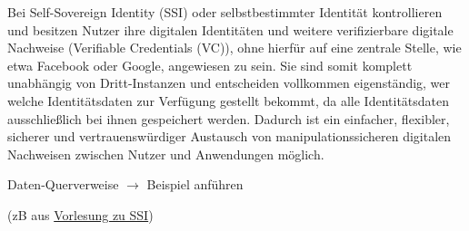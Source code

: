 \begin{Solution}

Bei Self-Sovereign Identity (SSI) oder selbstbestimmter Identität kontrollieren und besitzen Nutzer ihre digitalen Identitäten und weitere verifizierbare digitale Nachweise (Verifiable Credentials (VC)), ohne hierfür auf eine zentrale Stelle, wie etwa Facebook oder Google, angewiesen zu sein. Sie sind somit komplett unabhängig von Dritt-Instanzen und entscheiden vollkommen eigenständig, wer welche Identitätsdaten zur Verfügung gestellt bekommt, da alle Identitätsdaten ausschließlich bei ihnen gespeichert werden. Dadurch ist ein einfacher, flexibler, sicherer und vertrauenswürdiger Austausch von manipulationssicheren digitalen Nachweisen zwischen Nutzer und Anwendungen möglich.

\end{Solution}

\vspace{0.3cm}


\begin{Solution}

Daten-Querverweise $\rightarrow$ Beispiel anführen 

(zB aus \href{https://norbert-pohlmann.com/glossar-cyber-sicherheit/self-sovereign-identity-ssi/}{Vorlesung zu SSI})

\end{Solution}

\vspace{0.5cm}